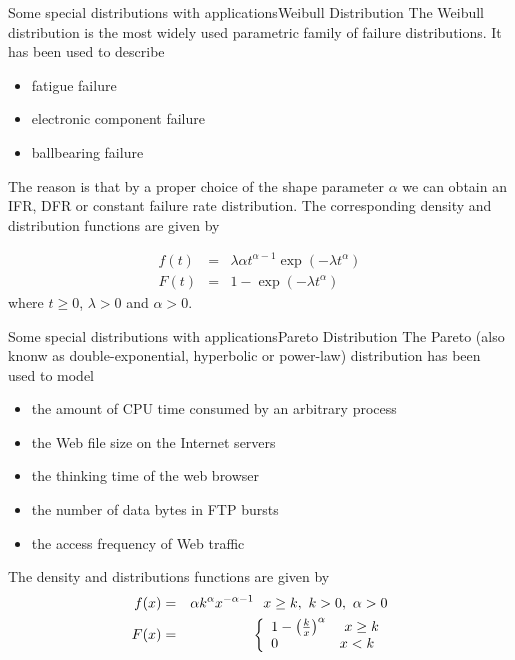 \documentclass[handout]{beamer}
\begin{document}
\begin{frame}{Some special distributions with applications}{Weibull Distribution}
The Weibull distribution is the most widely used parametric family of failure distributions. It has been used to describe
\begin{itemize}
 \item fatigue failure
 \item electronic component failure
 \item ballbearing failure
\end{itemize}
The reason is that by a proper choice of the shape parameter $\alpha$ we can obtain an IFR, DFR or constant failure rate 
distribution. The corresponding density and distribution functions are given by

 \begin{eqnarray*}
f(t) &=& \lambda \alpha t^{\alpha -1} \exp(-\lambda t ^\alpha)\\ 
F(t) &=&  1 - \exp(-\lambda t ^\alpha)
 \end{eqnarray*}
where $t \geq 0$, $\lambda > 0$ and $\alpha > 0$.
\end{frame}

\begin{frame}{Some special distributions with applications}{Pareto Distribution}
 The Pareto (also knonw as double-exponential, hyperbolic or power-law) distribution has been used 
to model 
\begin{itemize}
\item the amount of CPU time consumed by an arbitrary process
\item the Web file size on the Internet servers
\item the thinking time of the web browser
\item the number of data bytes in FTP bursts
\item the access frequency of Web traffic 
\end{itemize}
The density and distributions functions are given by
 \begin{eqnarray*}
f(x) &=& \alpha k^{\alpha} x^{-\alpha -1} \ \ x \geq k, \ k>0, \ \alpha > 0\\ 
F(x) &=& \left\{ \begin{array}{l l}
            1 - \left( \frac{k}{x} \right) ^\alpha & \ x \geq k \\
            0 & x < k    
           \end{array} \right. 
 \end{eqnarray*}
\end{frame}
\end{document}
